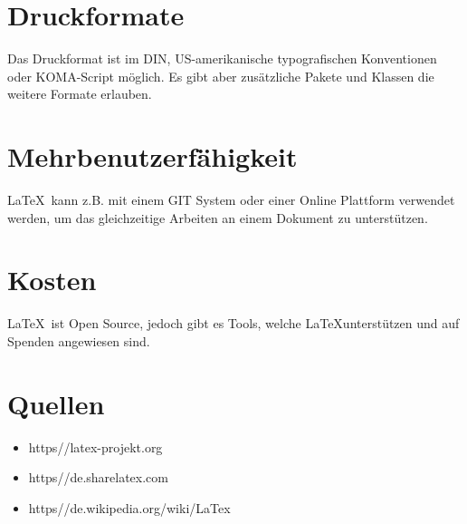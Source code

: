 \documentclass{article}
\begin{document}
\section{Druckformate}
Das Druckformat ist im DIN, US-amerikanische typografischen Konventionen oder KOMA-Script möglich. Es gibt aber zusätzliche Pakete und Klassen die weitere Formate erlauben.

\section{Mehrbenutzerfähigkeit}
\LaTeX\ kann z.B. mit einem GIT System oder einer Online Plattform verwendet werden, um das gleichzeitige Arbeiten an einem Dokument zu unterstützen. 

\section{Kosten}
\LaTeX\ ist Open Source, jedoch gibt es Tools, welche \LaTeX unterstützen und auf Spenden angewiesen sind.

\section{Quellen}
\begin{itemize}
	\item https//latex-projekt.org
	\item https//de.sharelatex.com
	\item https//de.wikipedia.org/wiki/LaTex
\end{itemize}
\end{document}
